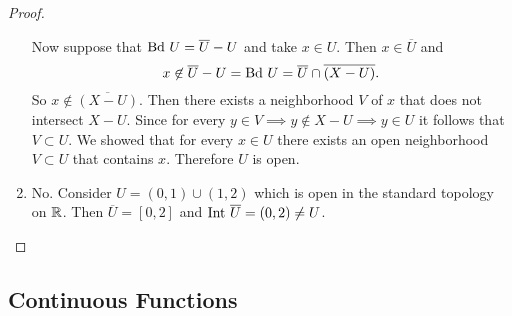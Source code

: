 \begin{proof}
\begin{enumerate}
            Now suppose that $\text{Bd } U = \overline{U}-U$ and take $x\in U$. Then $x\in\overline{U}$ and
                $$x\not\in \overline{U}-U=\text{Bd } U=\overline{U}\cap\overline{\left(X-U\right)}.$$
            So $x\not\in\overline{\left(X-U\right)}$. Then there exists a neighborhood $V$ of $x$ that does not intersect $X-U$.
            Since for every $y\in V\implies y\not\in X-U\implies y\in U$ it follows that $V\subset U$.
            We showed that for every $x\in U$ there exists an open neighborhood $V\subset U$ that contains $x$. Therefore $U$ is open.
        \item No. Consider $U=(0,1)\cup(1,2)$ which is open in the standard topology on $\mathbb{R}$.
            Then $\overline{U}=[0,2]$ and $\text{Int }\overline{U}=(0,2)\neq U$.
   \end{enumerate} 
\end{proof}
\subsection{Continuous Functions}
